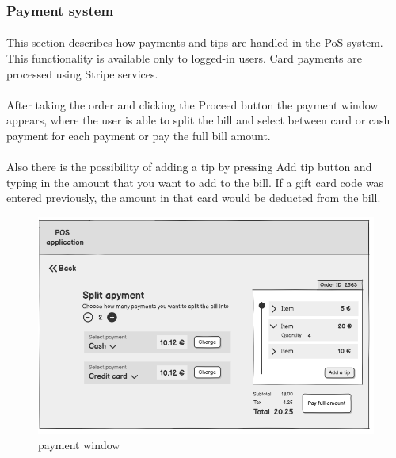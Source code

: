 \documentclass{article}
\begin{document}
    \subsubsection{Payment system}
    \paragraph{}This section describes how payments and tips are handled in the PoS system. This functionality is available only to logged-in users. Card payments are processed using Stripe services.
    \paragraph{}After taking the order and clicking the Proceed button the payment window appears, where the user is able to split the bill and select between card or cash payment for each payment or pay the full bill amount.
    \paragraph{}Also there is the possibility of adding a tip by pressing Add tip button and typing in the amount that you want to add to the bill. If a gift card code was entered previously, the amount in that card would be deducted from the bill. 
    \begin{figure}[H]
        \centering
        \includegraphics[width=0.9\linewidth]{PSP/lab-1/mockups/payments.png}
        \caption{payment window}
        \label{}
    \end{figure}
\end{document}
